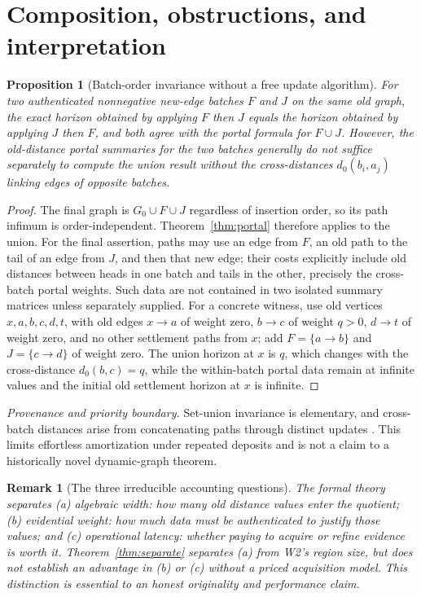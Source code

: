 \documentclass[11pt,letterpaper]{article}
\newtheorem{proposition}[theorem]{Proposition}
\newtheorem{remark}[theorem]{Remark}
\newcommand{\attrib}[1]{\par\noindent\textit{Provenance and priority boundary.} #1\par}
\begin{document}
\section{Composition, obstructions, and interpretation}
\begin{proposition}[Batch-order invariance without a free update algorithm]\label{prop:batch}
For two authenticated nonnegative new-edge batches $F$ and $J$ on the same old graph, the exact horizon obtained by applying $F$ then $J$ equals the horizon obtained by applying $J$ then $F$, and both agree with the portal formula for $F\cup J$. However, the old-distance portal summaries for the two batches generally do not suffice \emph{separately} to compute the union result without the cross-distances $d_0(b_i,a_j)$ linking edges of opposite batches.
\end{proposition}
\begin{proof}
The final graph is $G_0\cup F\cup J$ regardless of insertion order, so its path infimum is order-independent. Theorem~\ref{thm:portal} therefore applies to the union. For the final assertion, paths may use an edge from $F$, an old path to the tail of an edge from $J$, and then that new edge; their costs explicitly include old distances between heads in one batch and tails in the other, precisely the cross-batch portal weights. Such data are not contained in two isolated summary matrices unless separately supplied. For a concrete witness, use old vertices $x,a,b,c,d,t$, with old edges $x\to a$ of weight zero, $b\to c$ of weight $q>0$, $d\to t$ of weight zero, and no other settlement paths from $x$; add $F=\{a\to b\}$ and $J=\{c\to d\}$ of weight zero. The union horizon at $x$ is $q$, which changes with the cross-distance $d_0(b,c)=q$, while the within-batch portal data remain at infinite values and the initial old settlement horizon at $x$ is infinite.
\end{proof}
\attrib{Set-union invariance is elementary, and cross-batch distances arise from concatenating paths through distinct updates \cite{Bellman,Mohri,Dynamic,Demetrescu}. This limits effortless amortization under repeated deposits and is not a claim to a historically novel dynamic-graph theorem.}

\begin{remark}[The three irreducible accounting questions]
The formal theory separates (a) \emph{algebraic width}: how many old distance values enter the quotient; (b) \emph{evidential weight}: how much data must be authenticated to justify those values; and (c) \emph{operational latency}: whether paying to acquire or refine evidence is worth it. Theorem~\ref{thm:separate} separates (a) from W2's region size, but does not establish an advantage in (b) or (c) without a priced acquisition model. This distinction is essential to an honest originality and performance claim.
\end{remark}
\end{document}
